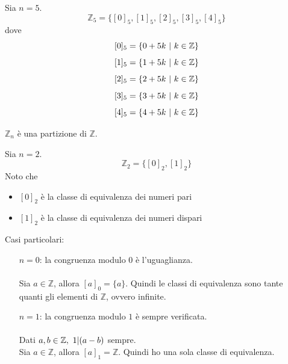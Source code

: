 \documentclass[a4paper,12pt, oneside]{book}
\begin{document}
		\begin{shaded}
			\begin{esempio}
				Sia $n=5$.\\
				$$\mathbb{Z}_5 = \{ [0]_5,[1]_5,[2]_5,[3]_5,[4]_5  \}$$
				dove
				$$[0]_5 = \{ 0+5k \mbox{\space}|\mbox{\space} k \in \mathbb{Z} \}$$
				$$[1]_5 = \{ 1+5k \mbox{\space}|\mbox{\space} k \in \mathbb{Z} \}$$
				$$[2]_5 = \{ 2+5k \mbox{\space}|\mbox{\space} k \in \mathbb{Z} \}$$
				$$[3]_5 = \{ 3+5k \mbox{\space}|\mbox{\space} k \in \mathbb{Z} \}$$
				$$[4]_5 = \{ 4+5k \mbox{\space}|\mbox{\space} k \in \mathbb{Z} \}$$	
			\end{esempio}
		\end{shaded}
		\begin{nota}
			$\mathbb{Z}_n$ è una partizione di $\mathbb{Z}$.
		\end{nota}
		\begin{shaded}
			\begin{esempio}
				Sia $n=2$.\\
				$$\mathbb{Z}_2 = \{ [0]_2,[1]_2  \}$$
				Noto che \begin{itemize}
					\item $[0]_2$ è la classe di equivalenza dei numeri pari
					\item $[1]_2$ è la classe di equivalenza dei numeri dispari
				\end{itemize}  
			\end{esempio}
		\end{shaded}
		\begin{osservazione}
			Casi particolari:
			\begin{enumerate}
				\item [$n = 0$: ] la congruenza modulo $0$ è l'uguaglianza.\\\\
					Sia $a \in \mathbb{Z}$, allora $[a]_0 = \{a\}$. Quindi le classi di equivalenza sono tante quanti gli elementi di $\mathbb{Z}$, ovvero infinite.
				\item [$n = 1$: ] la congruenza modulo $1$ è sempre verificata.\\\\
					Dati $a,b \in \mathbb{Z}, \mbox{\space} 1|(a-b)$ sempre.\\
					Sia $a \in \mathbb{Z}$, allora $[a]_1 = \mathbb{Z}$. Quindi ho una sola classe di equivalenza.
			\end{enumerate}
		\end{osservazione}
	
\end{document}

